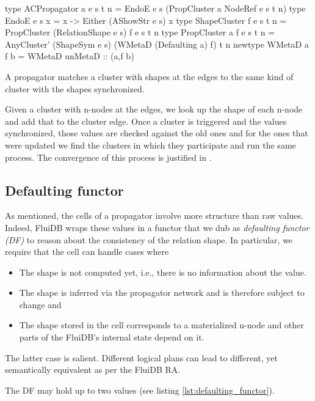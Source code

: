 \begin{code}
  \begin{haskellcode}
    type ACPropagator a e s t n =
      EndoE e s (PropCluster a NodeRef e s t n)
    type EndoE e s x = x -> Either (AShowStr e s) x
    type ShapeCluster f e s t n =
      PropCluster (RelationShape e s) f e s t n
    type PropCluster a f e s t n =
      AnyCluster' (ShapeSym e s) (WMetaD (Defaulting a) f) t n
    newtype WMetaD a f b = WMetaD { unMetaD :: (a,f b)}
  \end{haskellcode}
  \caption{\label{lst:acpropagator}A propagator matches a cluster with
    shapes at the edges to the same kind of cluster with the shapes
    synchronized.}
\end{code}

Given a cluster with n-nodes at the edges, we look up the shape of each
n-node and add that to the cluster edge.  Once a cluster is triggered
and the values synchronized, those values are checked against the old
ones and for the ones that were updated we find the clusters in which
they participate and run the same process. The convergence of this
process is justified in \cite{kuperLVarsLatticebasedData2013}.

\subsection{Defaulting functor}

As mentioned, the cells of a propagator involve more structure than
raw values. Indeed, FluiDB wraps these values in a functor that we dub
as \emph{defaulting functor (DF)} to reason about the consistency of
the relation shape. In particular, we require that the cell can handle
cases where

\begin{itemize}
\item The shape is not computed yet, i.e., there is no information
  about the value.
\item The shape is inferred via the propagator network and is
therefore subject to change and
\item The shape stored in the cell corresponds to a materialized n-node
and other parts of the FluiDB's internal state depend on it.
\end{itemize}

The latter case is salient. Different logical plans can lead to
different, yet semantically equivalent as per the FluiDB RA.

The DF may hold up to two values (see listing
\ref{lst:defaulting_functor}).

